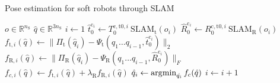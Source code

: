 \begin{algorithm}[hbt!]
\caption{Pose estimation for soft robots through SLAM}\label{alg:srslampose_estimation}
\begin{algorithmic}
\REQUIRE $o \in \mathbb{R}^{n_\mathrm{S}}$ 
\ENSURE $\hat{q} \in \mathbb{R}^{3 n_\mathrm{S}}$ 
\STATE $i \gets 1$
    \vspace{0.25em}
    \STATE $\hat{t}_{0}^{\mathrm{c}_i} \gets T_0^{\mathrm{c},\mathrm{t}0,i} \: \mathrm{SLAM}_\mathrm{t}(o_i)$ 
    \vspace{0.25em}
    \STATE $\hat{R}_{0}^{\mathrm{c}_i} \gets R_0^{\mathrm{c},\mathrm{t}0,i} \: \mathrm{SLAM}_\mathrm{R}(o_i)$ 
    \vspace{0.25em}
    \STATE $f_{\mathrm{t},i}(\hat{q}) \gets
    \big\lVert 
    \Pi_\mathrm{t}(\hat{q}_i) - \Psi_\mathrm{t}(q_1 \dots q_{i-1}, \hat{t}_{0}^{\mathrm{c}_i})
    \big\rVert_2$
    \vspace{0.25em}
    \STATE $f_{\mathrm{R},i}(\hat{q}) \gets
    \big\lVert 
    \Pi_\mathrm{R}(\hat{q}_i) - \Psi_\mathrm{R}(q_1 \dots q_{i-1}, \hat{R}_{0}^{\mathrm{c}_i})
    \big\rVert_F$
    \vspace{0.25em}
    \STATE $f_{c,i}(\hat{q}) \gets f_{\mathrm{t},i}(\hat{q}) + \lambda_\mathrm{R} f_{\mathrm{R},i}(\hat{q})$ 
    \vspace{0.25em}
    \STATE $\hat{q}_i \gets \operatorname*{\arg\!\min}_{\hat{q_i}} f_c(\hat{q})$
    \vspace{0.25em}
    \STATE $i \gets i + 1$
\ENDWHILE
\end{algorithmic}
\end{algorithm}
